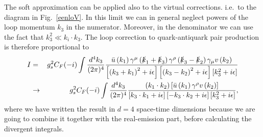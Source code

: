 The soft approximation can be applied also to the virtual
corrections. i.e.\ to the diagram in Fig.~\ref{eenloV}. In this limit we can in general neglect powers of the
loop momentum $k_3$ in the numerator.  Moreover, in the denominator we can use the fact that $k_3^{2}\ll k_i\cdot k_3$. The loop correction to quark-antiquark pair production is therefore proportional to
\begin{eqnarray}
I&=&g_s^{2} C_{F}(-i)\int\frac{d^{4}k_3}{(2\pi)^{4}}\frac{\bar{u}\left(k_1\right)\gamma^{\mu}\left(\slashed{k}_1+\slashed{k}_3\right)\gamma^{\rho}\left(\slashed{k}_3-\slashed{k}_2\right)\gamma_{\mu}v\left(k_2\right)}{\left[\left(k_3+k_1\right)^{2}+i\epsilon\right]\left[\left(k_3-k_2\right)^{2}+i\epsilon\right]\left[k_3^{2}+i\epsilon\right]}\nonumber\\
&\to&g_s^{2} C_{F}(-i)\int\frac{d^{4}k_3}{(2\pi)^{4}}\frac{\left(k_1\cdot k_2\right)\left[\bar{u}\left(k_1\right)\gamma^{\rho}v\left(k_2\right)\right]} {\left[k_3\cdot k_1+i\epsilon\right]\left[-k_3\cdot k_2+i\epsilon\right]\left[k_3^{2}+i\epsilon\right]},
\end{eqnarray}
where we have written the result in $d=4$ space-time dimensions
because we are going to combine it together with the real-emission
part, before calculating the divergent integrals.

